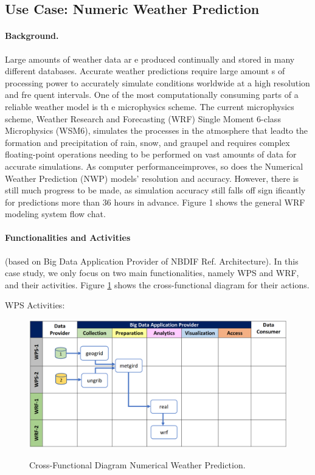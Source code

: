 \subsection{Use Case: Numeric Weather Prediction}


\paragraph*{Background.}
Large amounts of weather data ar e produced continually and stored in many different databases.
Accurate weather predictions require large amount s of processing power to accurately simulate
conditions worldwide at a high resolution and fre quent intervals. One of the most computationally
consuming parts of a reliable weather model is th e microphysics scheme. The current microphysics
scheme, Weather Research and Forecasting (WRF) Single Moment 6-class Microphysics (WSM6),
simulates the processes in the atmosphere that leadto the formation and precipitation of rain, snow,
and graupel and requires complex floating-point operations needing to be performed on vast
amounts of data for accurate simulations. As computer performanceimproves, so does the Numerical
Weather Prediction (NWP) models' resolution and accuracy. However, there is still much progress to
be made, as simulation accuracy still falls off sign ificantly for predictions more than 36 hours in
advance. Figure 1 shows the general WRF modeling system flow chat.

\paragraph*{Functionalities and Activities} (based on Big Data Application Provider of NBDIF Ref. Architecture).
In this case study, we only focus on two main functionalities, namely WPS and WRF, and their activities.
Figure \ref{fig:weather} shows the cross-functional diagram for their actions.

WPS Activities:

\begin{figure}[htb]
\includegraphics[width=1.0\textwidth]{usecase/weather.png}
\label{fig:weather}
\caption{Cross-Functional Diagram Numerical Weather Prediction.}
\end{figure}

